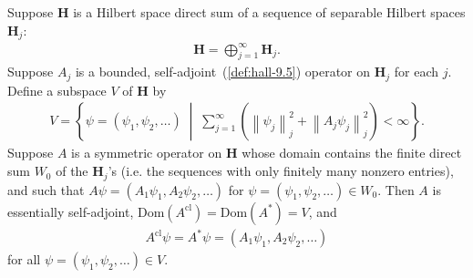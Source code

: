 \begin{proposition}
    \label{prpstn:hall-9.26}
    \leanok
    Suppose $\mathbf{H}$ is a Hilbert space direct sum of a sequence of separable Hilbert spaces $\mathbf{H}_j$:
    \begin{align}
        \mathbf{H} = \bigoplus_{j=1}^\infty \mathbf{H}_j.
    \end{align}
    Suppose $A_j$ is a bounded, self-adjoint~(\ref{def:hall-9.5}) operator on $\mathbf{H}_j$ for each $j$. Define a subspace $V$ of $\mathbf{H}$ by
    \begin{align}
        V = \left\{ \psi = (\psi_1, \psi_2, \ldots) \;\middle|\; \sum_{j=1}^\infty \left( \left\| \psi_j \right\|_j^2 + \left\| A_j \psi_j \right\|_j^2 \right) < \infty \right\}.
    \end{align}
    Suppose $A$ is a symmetric operator on $\mathbf{H}$ whose domain contains the finite direct sum $W_0$ of the $\mathbf{H}_j$'s (i.e. the sequences with only finitely many nonzero entries), and such that $A \psi = (A_1 \psi_1, A_2 \psi_2, \ldots)$ for $\psi = (\psi_1, \psi_2, \ldots) \in W_0$. Then $A$ is essentially self-adjoint, $\text{Dom}(A^{\text{cl}}) = \text{Dom}(A^*) = V$, and
    \begin{align}
        A^{\text{cl}}\psi = A^*\psi = (A_1 \psi_1, A_2 \psi_2, \ldots)
    \end{align}
    for all $\psi = (\psi_1, \psi_2, \ldots) \in V$.
\end{proposition}
